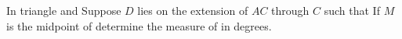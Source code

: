 In triangle    and  Suppose $D$ lies on the extension of $AC$ through $C$ such that  If $M$ is the midpoint of  determine the measure of  in degrees.